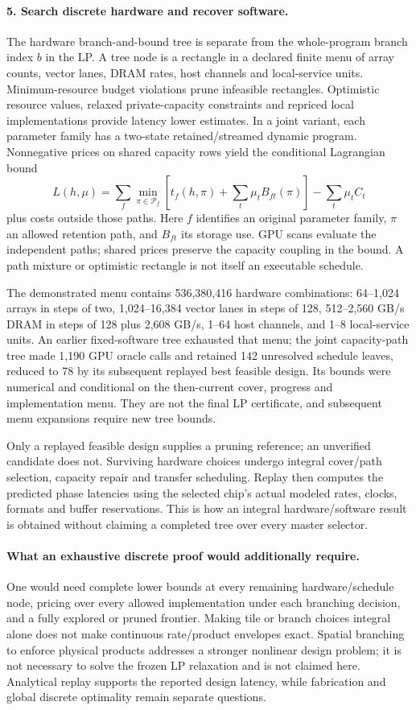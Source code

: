 \paragraph{5. Search discrete hardware and recover software.}
The hardware branch-and-bound tree is separate from the whole-program branch index $b$ in the LP.
A tree node is a rectangle in a declared finite menu of array counts, vector lanes, DRAM rates, host channels and local-service units.
Minimum-resource budget violations prune infeasible rectangles.
Optimistic resource values, relaxed private-capacity constraints and repriced local implementations provide latency lower estimates.
In a joint variant, each parameter family has a two-state retained/streamed dynamic program.
Nonnegative prices on shared capacity rows yield the conditional Lagrangian bound
\[ L(h,\mu)=\sum_f\min_{\pi\in\mathcal P_f} \left[t_f(h,\pi)+\sum_t\mu_t B_{ft}(\pi)\right] -\sum_t\mu_t C_t \]
plus costs outside those paths.
Here $f$ identifies an original parameter family, $\pi$ an allowed retention path, and $B_{ft}$ its storage use.
GPU scans evaluate the independent paths; shared prices preserve the capacity coupling in the bound.
A path mixture or optimistic rectangle is not itself an executable schedule.

The demonstrated menu contains 536,380,416 hardware combinations: 64--1,024 arrays in steps of two, 1,024--16,384 vector lanes in steps of 128, 512--2,560 GB/s DRAM in steps of 128 plus 2,608 GB/s, 1--64 host channels, and 1--8 local-service units.
An earlier fixed-software tree exhausted that menu; the joint capacity-path tree made 1,190 GPU oracle calls and retained 142 unresolved schedule leaves, reduced to 78 by its subsequent replayed best feasible design.
Its bounds were numerical and conditional on the then-current cover, progress and implementation menu.
They are not the final LP certificate, and subsequent menu expansions require new tree bounds.

Only a replayed feasible design supplies a pruning reference; an unverified candidate does not.
Surviving hardware choices undergo integral cover/path selection, capacity repair and transfer scheduling.
Replay then computes the predicted phase latencies using the selected chip's actual modeled rates, clocks, formats and buffer reservations.
This is how an integral hardware/software result is obtained without claiming a completed tree over every master selector.

\paragraph{What an exhaustive discrete proof would additionally require.}
One would need complete lower bounds at every remaining hardware/schedule node, pricing over every allowed implementation under each branching decision, and a fully explored or pruned frontier.
Making tile or branch choices integral alone does not make continuous rate/product envelopes exact.
Spatial branching to enforce physical products addresses a stronger nonlinear design problem; it is not necessary to solve the frozen LP relaxation and is not claimed here.
Analytical replay supports the reported design latency, while fabrication and global discrete optimality remain separate questions.

